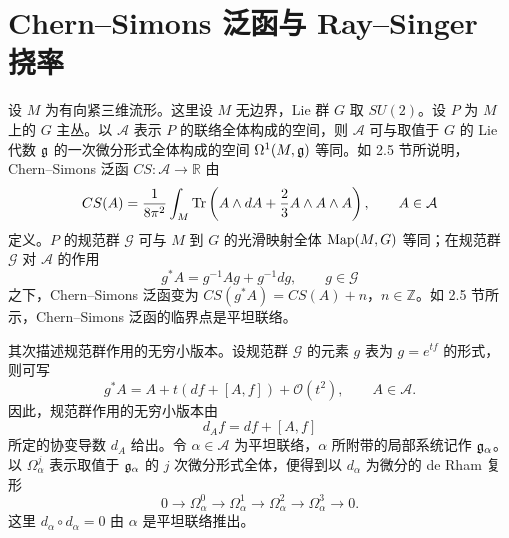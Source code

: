 
\section{Chern--Simons 泛函与 Ray--Singer 挠率}


设 $M$ 为有向紧三维流形。这里设 $M$ 无边界，Lie 群 $G$ 取 $SU(2)$。设 $P$ 为 $M$ 上的 $G$ 主丛。以 $\mathcal{A}$ 表示 $P$ 的联络全体构成的空间，则 $\mathcal{A}$ 可与取值于 $G$ 的 Lie 代数 $\mathfrak{g}$ 的一次微分形式全体构成的空间 $\Omega^{1}(M,\mathfrak{g})$ 等同。如 2.5 节所说明，Chern--Simons 泛函 $CS\colon\mathcal{A}\to\mathbb{R}$ 由
\[
  CS(A)=\frac{1}{8\pi^{2}}\int_{M}\operatorname{Tr}\left(A\wedge dA+\frac{2}{3}A\wedge A\wedge A\right),
  \qquad A\in\mathcal{A}
\]
定义。$P$ 的规范群 $\mathcal{G}$ 可与 $M$ 到 $G$ 的光滑映射全体 $\operatorname{Map}(M,G)$ 等同；在规范群 $\mathcal{G}$ 对 $\mathcal{A}$ 的作用
\[
  g^{*}A=g^{-1}Ag+g^{-1}dg,\qquad g\in\mathcal{G}
\]
之下，Chern--Simons 泛函变为 $CS(g^{*}A)=CS(A)+n$，$n\in\mathbb{Z}$。如 2.5 节所示，Chern--Simons 泛函的临界点是平坦联络。


其次描述规范群作用的无穷小版本。设规范群 $\mathcal{G}$ 的元素 $g$ 表为 $g=e^{tf}$ 的形式，则可写
\[
  g^{*}A=A+t(df+[A,f])+\mathcal{O}(t^{2}),\qquad A\in\mathcal{A}.
\]
因此，规范群作用的无穷小版本由
\begin{equation}
  d_{A}f=df+[A,f] \tag{3.19}
\end{equation}
所定的协变导数 $d_{A}$ 给出。令 $\alpha\in\mathcal{A}$ 为平坦联络，$\alpha$ 所附带的局部系统记作 $\mathfrak{g}_{\alpha}$。以 $\Omega^{j}_{\alpha}$ 表示取值于 $\mathfrak{g}_{\alpha}$ 的 $j$ 次微分形式全体，便得到以 $d_{\alpha}$ 为微分的 de Rham 复形
\[
  0\longrightarrow\Omega^{0}_{\alpha}\longrightarrow\Omega^{1}_{\alpha}
  \longrightarrow\Omega^{2}_{\alpha}\longrightarrow\Omega^{3}_{\alpha}\longrightarrow 0 .
\]
这里 $d_{\alpha}\circ d_{\alpha}=0$ 由 $\alpha$ 是平坦联络推出。

